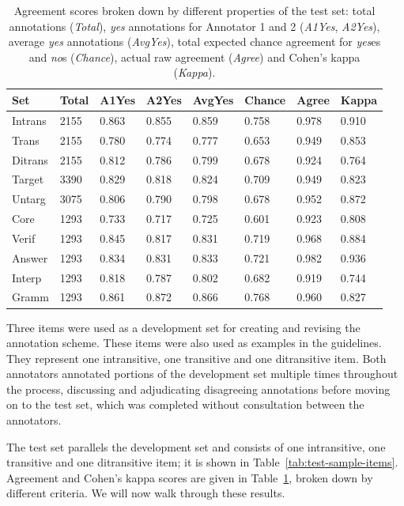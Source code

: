 \documentclass[11pt,a4paper]{article}
\begin{document}
\begin{table}[htb!]
\begin{center}
\begin{tabular}{|l|l|l|l|l||l|l||l|}
\hline
Set	& Total	& A1Yes & A2Yes & AvgYes & Chance & Agree & Kappa \\
\hline
\hline
Intrans & 2155 & 0.863 & 0.855 & 0.859 & 0.758 & 0.978 & 0.910 \\
\hline
Trans & 2155 & 0.780 & 0.774 & 0.777 & 0.653 & 0.949 & 0.853 \\
\hline
Ditrans & 2155 & 0.812 & 0.786 & 0.799 & 0.678 & 0.924 & 0.764 \\ 
\hline
\hline
Target & 3390 & 0.829 & 0.818 & 0.824 & 0.709 & 0.949 & 0.823 \\
\hline
Untarg & 3075 & 0.806 & 0.790 & 0.798 & 0.678 & 0.952 & 0.872 \\
\hline
\hline
Core & 1293 & 0.733 & 0.717 & 0.725 & 0.601 & 0.923 & 0.808 \\
\hline
Verif & 1293 & 0.845 & 0.817 & 0.831 & 0.719 & 0.968 & 0.884 \\
\hline
Answer & 1293 & 0.834 & 0.831 & 0.833 & 0.721 & 0.982 & 0.936 \\
\hline
Interp & 1293 & 0.818 & 0.787 & 0.802 & 0.682 & 0.919 & 0.744 \\
\hline
Gramm & 1293 & 0.861 & 0.872 & 0.866 & 0.768 & 0.960 & 0.827 \\
\hline
\end{tabular}
\caption{\label{tab:agreement} Agreement scores broken down by different properties of the test set: total annotations (\textit{Total}), \textit{yes} annotations for Annotator 1 and 2 (\textit{A1Yes}, \textit{A2Yes}), average \textit{yes} annotations (\textit{AvgYes}), total expected chance agreement for \textit{yes}es and \textit{no}s (\textit{Chance}), actual raw agreement (\textit{Agree}) and Cohen's kappa (\textit{Kappa}).}
\end{center}
\end{table}

Three items were used as a development set for creating and revising the annotation scheme. These items were also used as examples in the guidelines. They represent one intransitive, one transitive and one ditransitive item. Both annotators annotated portions of the development set multiple times throughout the process, discussing and adjudicating disagreeing annotations before moving on to the test set, which was completed without consultation between the annotators.

The test set parallels the development set and consists of one intransitive, one transitive and one ditransitive item; it is shown in Table~\ref{tab:test-sample-items}. Agreement and Cohen's kappa scores are given in Table~\ref{tab:agreement}, broken down by different criteria.  We will now walk through these results.
\end{document}
